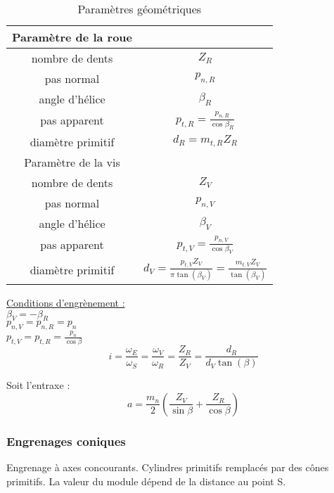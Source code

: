 \documentclass[../main.tex]{subfiles}
\begin{document}
\begin{table}[hbt!]
    \centering
    \begin{tabular}{c|c}
        \hline\hline
        Paramètre de la roue & \\
        \hline
        nombre de dents & $Z_R$ \\
        \hline
        pas normal & $p_{n,R}$\\
        \hline
        angle d'hélice & $\beta_R$\\
        \hline
        pas apparent & $p_{t,R} = \frac{p_{n,R}}{\cos{\beta_R}}$\\
        \hline
        diamètre primitif & $d_R = m_{t,R} Z_R$\\
        \hline\hline
        Paramètre de la vis & \\
        \hline
        nombre de dents & $Z_V$ \\
        \hline
        pas normal & $p_{n,V}$\\
        \hline
        angle d'hélice & $\beta_V$\\
        \hline
        pas apparent & $p_{t,V} = \frac{p_{n,V}}{\cos{\beta_V}}$\\
        \hline
        diamètre primitif & $d_V = \frac{p_{t,V}Z_V}{\pi \tan(\beta_V)} = \frac{m_{t,V}Z_V}{\tan(\beta_V)} $\\
        \hline\hline
    \end{tabular}
    \caption{Paramètres géométriques}
\end{table}

\quad \underline{Conditions d'engrènement :}\\
$\beta_V = -\beta_R$\\
$p_{n,V} = p_{n,R} = p_n$\\
$p_{t,V} = p_{t,R} = \frac{p_n}{\cos{\beta}}$\\

\begin{equation}
    i = \frac{\omega_E}{\omega_S} = \frac{\omega_V}{\omega_R} = \frac{Z_R}{Z_V} = \frac{d_R}{d_V \tan(\beta)}
\end{equation}

Soit l'entraxe : 
\begin{equation}
    a = \frac{m_n}{2}(\frac{Z_V}{\sin{\beta}} + \frac{Z_R}{\cos{\beta}})
\end{equation}


\subsubsection{Engrenages coniques}
Engrenage à axes concourants. Cylindres primitifs remplacés par des cônes primitifs. La valeur du module dépend de la distance au point S.\\
\end{document}
